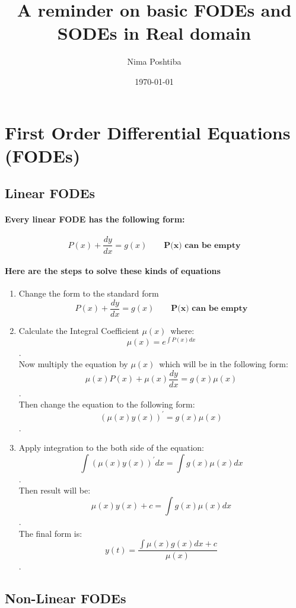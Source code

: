 \documentclass{article}
\author{Nima Poshtiba}
\date{\today}
\title{A reminder on basic FODEs and SODEs in Real domain}
\begin{document}
\maketitle

\section{First Order Differential Equations (FODEs)}
\subsection{Linear FODEs}
\paragraph{Every linear FODE has the following form:}
\[
	P(x)+\frac{dy}{dx}=g(x) \qquad \textbf{P(x) can be empty}
\]
\paragraph{Here are the steps to solve these kinds of equations}
\begin{enumerate}
	\item Change the form to the standard form \[	P(x)+\frac{dy}{dx}=g(x) \qquad \textbf{P(x) can be empty}\]\vspace{2em}
	\item Calculate the Integral Coefficient $\mu(x)$\, where: \[\mu(x)=e^{\int{P(x)dx}}\].\\ \vspace{2em}
	Now multiply the equation by $\mu(x)\,$
	which will be in the following form: \[\mu(x)P(x)+\mu(x)\frac{dy}{dx}=g(x)\mu(x)\].\\
	Then change the equation to the following form: \[(\mu(x)y(x))^{'}=g(x)\mu(x)\].\\ \vspace{2em}
	\item Apply integration to the both side of the equation: \[\int{(\mu(x)y(x))^{'}dx}=\int{g(x)\mu(x)dx}\].\\
	Then result will be: \[\mu(x)y(x)+c=\int{g(x)\mu(x)dx}\].\\
	The final form is: \[y(t) = \frac{\int{\mu(x)g(x)dx}+c}{\mu(x)} \].\\ \vspace{2em}
\end{enumerate}
\subsection{Non-Linear FODEs}
\end{document}
